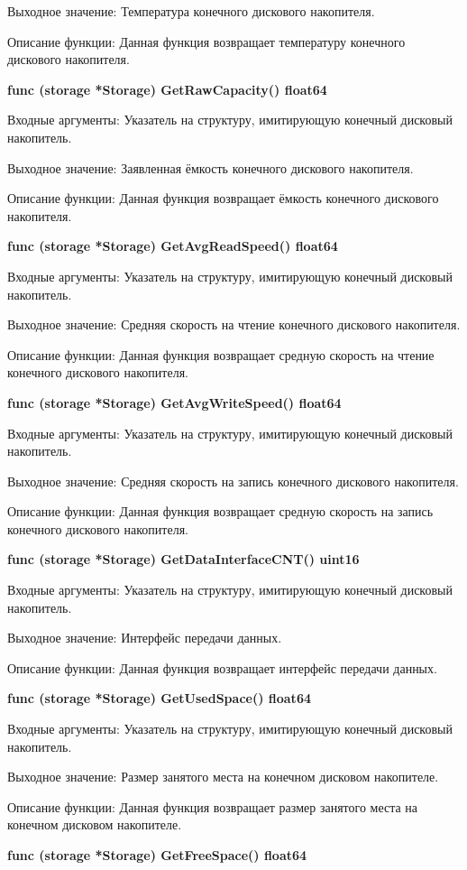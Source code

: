 Выходное значение: Температура конечного дискового накопителя.

Описание функции: Данная функция возвращает температуру конечного дискового накопителя.

\textbf{func (storage *Storage) GetRawCapacity() float64}

Входные аргументы: Указатель на структуру, имитирующую конечный дисковый накопитель.

Выходное значение: Заявленная ёмкость конечного дискового накопителя.

Описание функции: Данная функция возвращает ёмкость конечного дискового накопителя.

\textbf{func (storage *Storage) GetAvgReadSpeed() float64}

Входные аргументы: Указатель на структуру, имитирующую конечный дисковый накопитель.

Выходное значение: Средняя скорость на чтение конечного дискового накопителя.

Описание функции: Данная функция возвращает средную скорость на чтение конечного дискового накопителя.

\textbf{func (storage *Storage) GetAvgWriteSpeed() float64}

Входные аргументы: Указатель на структуру, имитирующую конечный дисковый накопитель.

Выходное значение: Средняя скорость на запись конечного дискового накопителя.

Описание функции: Данная функция возвращает средную скорость на запись конечного дискового накопителя.
 

\textbf{func (storage *Storage) GetDataInterfaceCNT() uint16}

Входные аргументы: Указатель на структуру, имитирующую конечный дисковый накопитель.

Выходное значение: Интерфейс передачи данных. 

Описание функции: Данная функция возвращает интерфейс передачи данных.

\textbf{func (storage *Storage) GetUsedSpace() float64 }

Входные аргументы: Указатель на структуру, имитирующую конечный дисковый накопитель.

Выходное значение:  Размер занятого места на конечном дисковом накопителе.

Описание функции: Данная функция возвращает размер занятого места на конечном дисковом накопителе.

\textbf{func (storage *Storage) GetFreeSpace() float64}

